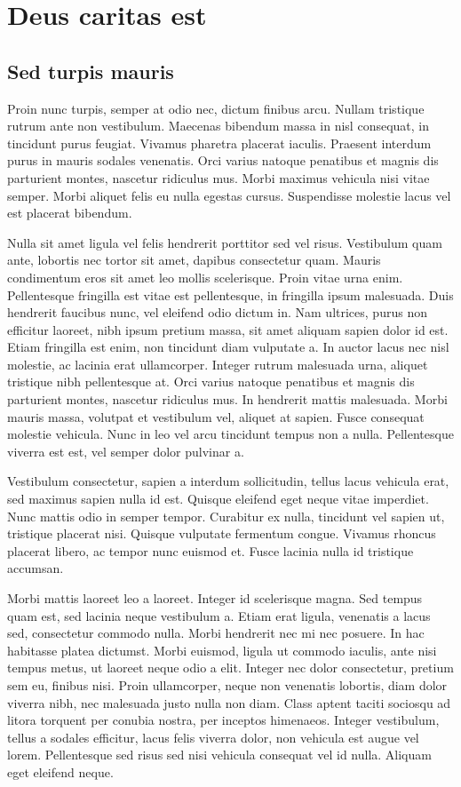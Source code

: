 \chapter{Deus caritas est}

\section{Sed turpis mauris}
Proin nunc turpis, semper at odio nec, dictum finibus arcu. Nullam tristique rutrum ante non vestibulum. Maecenas bibendum massa in nisl consequat, in tincidunt purus feugiat. Vivamus pharetra placerat iaculis. Praesent interdum purus in mauris sodales venenatis. Orci varius natoque penatibus et magnis dis parturient montes, nascetur ridiculus mus. Morbi maximus vehicula nisi vitae semper. Morbi aliquet felis eu nulla egestas cursus. Suspendisse molestie lacus vel est placerat bibendum.

Nulla sit amet ligula vel felis hendrerit porttitor sed vel risus. Vestibulum quam ante, lobortis nec tortor sit amet, dapibus consectetur quam. Mauris condimentum eros sit amet leo mollis scelerisque. Proin vitae urna enim. Pellentesque fringilla est vitae est pellentesque, in fringilla ipsum malesuada. Duis hendrerit faucibus nunc, vel eleifend odio dictum in. Nam ultrices, purus non efficitur laoreet, nibh ipsum pretium massa, sit amet aliquam sapien dolor id est. Etiam fringilla est enim, non tincidunt diam vulputate a. In auctor lacus nec nisl molestie, ac lacinia erat ullamcorper. Integer rutrum malesuada urna, aliquet tristique nibh pellentesque at. Orci varius natoque penatibus et magnis dis parturient montes, nascetur ridiculus mus. In hendrerit mattis malesuada. Morbi mauris massa, volutpat et vestibulum vel, aliquet at sapien. Fusce consequat molestie vehicula. Nunc in leo vel arcu tincidunt tempus non a nulla. Pellentesque viverra est est, vel semper dolor pulvinar a.

Vestibulum consectetur, sapien a interdum sollicitudin, tellus lacus vehicula erat, sed maximus sapien nulla id est. Quisque eleifend eget neque vitae imperdiet. Nunc mattis odio in semper tempor. Curabitur ex nulla, tincidunt vel sapien ut, tristique placerat nisi. Quisque vulputate fermentum congue. Vivamus rhoncus placerat libero, ac tempor nunc euismod et. Fusce lacinia nulla id tristique accumsan.

Morbi mattis laoreet leo a laoreet. Integer id scelerisque magna. Sed tempus quam est, sed lacinia neque vestibulum a. Etiam erat ligula, venenatis a lacus sed, consectetur commodo nulla. Morbi hendrerit nec mi nec posuere. In hac habitasse platea dictumst. Morbi euismod, ligula ut commodo iaculis, ante nisi tempus metus, ut laoreet neque odio a elit. Integer nec dolor consectetur, pretium sem eu, finibus nisi. Proin ullamcorper, neque non venenatis lobortis, diam dolor viverra nibh, nec malesuada justo nulla non diam. Class aptent taciti sociosqu ad litora torquent per conubia nostra, per inceptos himenaeos. Integer vestibulum, tellus a sodales efficitur, lacus felis viverra dolor, non vehicula est augue vel lorem. Pellentesque sed risus sed nisi vehicula consequat vel id nulla. Aliquam eget eleifend neque.

